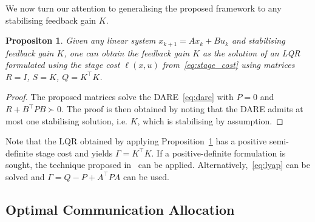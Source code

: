 \documentclass[letterpaper, 10 pt, conference]{ieeeconf}  %
\newtheorem{Proposition}[Theorem]{Propositon}
\begin{document}

We now turn our attention to generalising the proposed framework to any stabilising feedback gain $K$.
\begin{Proposition}
	\label{prop:Kriccati}
	Given any linear system $x_{k+1}=Ax_k+Bu_k$ and stabilising feedback gain $K$, one can obtain the feedback gain $K$ as the solution of an LQR formulated using the stage cost $\ell(x,u)$ from~\eqref{eq:stage_cost} using matrices $R=I$, $S=K$, $Q=K^\top K$. 
%		
\end{Proposition}
\begin{proof}
	The proposed matrices solve the DARE~\eqref{eq:dare} with $P=0$ and $R+B^\top PB \succ 0$.
	The proof is then obtained by noting that the DARE admits at most one stabilising solution, i.e. $K$, which is stabilising by assumption. 
\end{proof}
Note that the LQR obtained by applying Proposition~\ref{prop:Kriccati} has a positive semi-definite stage cost and yields $\Gamma = K^\top K$. If a positive-definite formulation is sought, the technique proposed in~\cite{Zanon2014d} can be applied. Alternatively,~\eqref{eq:lyap} can be solved and $\Gamma = Q - P + A^\top P A$ can be used.

\subsection{Optimal Communication Allocation}
\end{document}
